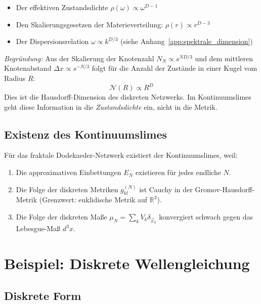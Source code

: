 \begin{itemize}
    \item Der effektiven Zustandsdichte \( \rho(\omega) \propto \omega^{D-1} \)
    \item Den Skalierungsgesetzen der Materieverteilung: \( \rho(r) \propto r^{D-3} \)
    \item Der Dispersionsrelation \( \omega \propto k^{D/3} \) (siehe Anhang~\ref{app:spektrale_dimension})
\end{itemize}

\emph{Begründung:} Aus der Skalierung der Knotenzahl \( N_N \propto s^{ND/3} \) und dem
mittleren Knotenabstand \( \Delta x \propto s^{-N/3} \) folgt für die Anzahl der
Zustände in einer Kugel vom Radius \( R \):
\[
\mathcal{N}(R) \propto R^D
\]
Dies ist die Hausdorff-Dimension des diskreten Netzwerks. Im Kontinuumslimes
geht diese Information in die \emph{Zustandsdichte} ein, nicht in die Metrik.

\subsection{Existenz des Kontinuumslimes}
\label{sub:kontinuumslimes_existenz}

Für das fraktale Dodekaeder-Netzwerk existiert der Kontinuumslimes, weil:

\begin{enumerate}
    \item Die approximativen Einbettungen \( E_N \) existieren für jedes endliche \( N \).
    \item Die Folge der diskreten Metriken \( g_{kl}^{(N)} \) ist Cauchy in der
          Gromov-Hausdorff-Metrik (Grenzwert: euklidische Metrik auf \( \mathbb{R}^3 \)).
    \item Die Folge der diskreten Maße \( \mu_N = \sum_k V_k \delta_{\vec{x}_k} \) konvergiert
          schwach gegen das Lebesgue-Maß \( d^3x \).
\end{enumerate}

\section{Beispiel: Diskrete Wellengleichung}
\label{app:kontinuumslimes_wellengleichung}

\subsection{Diskrete Form}
\label{sub:kontinuumslimes_welle_diskret}

